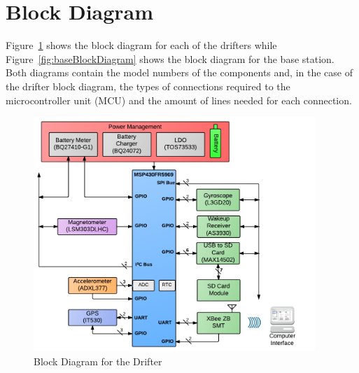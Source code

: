 \section{Block Diagram}

Figure~\ref{fig:drifterBlockDiagram} shows the block diagram for each of the drifters while Figure~\ref{fig:baseBlockDiagram} shows the block diagram for the base station.  Both diagrams contain the model numbers of the components and, in the case of the drifter block diagram, the types of connections required to the microcontroller unit (MCU) and the amount of lines needed for each connection.

\begin{figure}[H]
	\centering
	\includegraphics[width=0.95\textwidth]{img/blockDiagram}
	\caption{Block Diagram for the Drifter \label{fig:drifterBlockDiagram}}
\end{figure}

